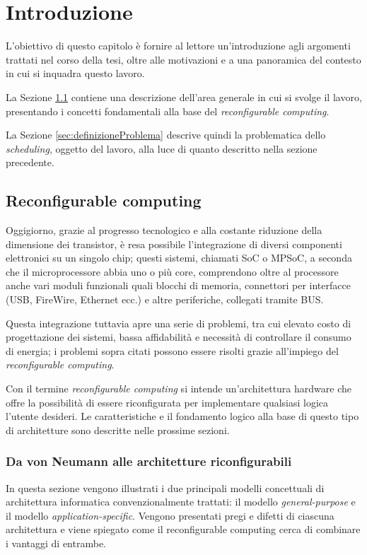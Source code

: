\chapter{Introduzione}
\label{chap:intro}
\vspace{1cm}
L'obiettivo di questo capitolo è fornire al lettore un'introduzione agli argomenti 
trattati nel corso della tesi, oltre alle motivazioni e a una panoramica del contesto in 
cui si inquadra questo lavoro.

La Sezione \ref{sec:reconfComp} contiene una descrizione dell'area generale in cui si 
svolge il lavoro, presentando i concetti fondamentali alla base del \emph{reconfigurable 
computing}.

La Sezione \ref{sec:definizioneProblema} descrive quindi la problematica dello 
\emph{scheduling}, oggetto del lavoro, alla luce di quanto descritto nella sezione 
precedente.


\section{Reconfigurable computing}
\label{sec:reconfComp}
Oggigiorno, grazie al progresso tecnologico e alla costante riduzione della dimensione 
dei transistor, è resa possibile l'integrazione di diversi componenti elettronici su un 
singolo chip; questi sistemi, chiamati \ac{SoC} o \ac{MPSoC}, a seconda 
che il microprocessore abbia uno o più core, comprendono oltre al processore anche vari 
moduli funzionali quali blocchi di memoria, connettori per interfacce (USB, FireWire, 
Ethernet ecc.) e altre periferiche, collegati tramite BUS.

Questa integrazione tuttavia apre una serie di problemi, tra cui elevato costo di 
progettazione dei sistemi, bassa affidabilità e necessità di controllare il consumo di 
energia; i problemi sopra citati possono essere risolti grazie all'impiego del 
\emph{reconfigurable computing}.

Con il termine \emph{reconfigurable computing} si intende un'architettura hardware che 
offre la possibilità di essere riconfigurata per implementare qualsiasi logica l'utente 
desideri. Le caratteristiche e il fondamento logico alla base di questo tipo di 
architetture sono descritte nelle prossime sezioni.

\subsection{Da von Neumann alle architetture riconfigurabili}
\label{subsec:cambioParadigma}
In questa sezione vengono illustrati i due principali modelli concettuali di architettura
informatica convenzionalmente trattati: il modello \emph{general-purpose} e il modello
\emph{application-specific}. Vengono presentati pregi e difetti di ciascuna architettura
e viene spiegato come il reconfigurable computing cerca di combinare i vantaggi di
entrambe.

